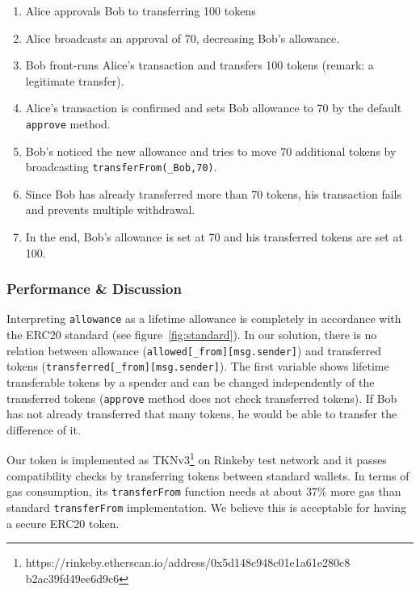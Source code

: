\begin{enumerate}
	\item Alice approvals Bob to transferring 100 tokens
	\item Alice broadcasts an approval of 70, decreasing Bob's allowance.
	\item Bob front-runs Alice’s transaction and transfers 100 tokens (remark: a legitimate transfer).
	\item Alice's transaction is confirmed and sets Bob allowance to 70 by the default \texttt{approve} method.
	\item Bob's noticed the new allowance and tries to move 70 additional tokens by broadcasting \texttt{transferFrom(\_Bob,70)}. 
	\item Since Bob has already transferred more than 70 tokens, his transaction fails and prevents multiple withdrawal. 
	\item In the end, Bob’s allowance is set at 70 and his transferred tokens are set at 100.
\end{enumerate}

\subsubsection*{Performance \& Discussion} Interpreting \texttt{allowance} as a lifetime allowance is completely in accordance with the ERC20 standard (see figure~\ref{fig:standard}). In our solution, there is no relation between allowance (\texttt{allowed[\_from][msg.sender]}) and transferred tokens (\texttt{transferred[\_from][msg.sender]}). The first variable shows lifetime transferable tokens by a spender and can be changed independently of the transferred tokens (\ie \texttt{approve} method does not check transferred tokens). If Bob has not already transferred that many tokens, he would be able to transfer the difference of it. 

Our token is implemented as TKNv3\footnote{https://rinkeby.etherscan.io/address/0x5d148c948c01e1a61e280c8 b2ac39fd49ee6d9c6} on Rinkeby test network and it passes compatibility checks by transferring tokens between standard wallets. In terms of gas consumption, its \texttt{transferFrom} function needs at about 37\% more gas than standard \texttt{transferFrom} implementation. We believe this is acceptable for having a secure ERC20 token.

